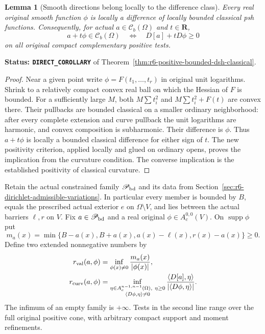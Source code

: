 \documentclass[11pt,a4paper]{article}
\numberwithin{equation}{section}
\newtheorem{lemma}[theorem]{Lemma}
\theoremstyle{definition}
\theoremstyle{remark}
\begin{document}
\begin{lemma}[Smooth directions belong locally to the difference class]
\label{lem:r6-smooth-direction-dsh}
Every real original smooth function $\phi$ is locally a difference
of locally bounded classical psh functions. Consequently, for actual
$a\in\mathcal C_b(\Omega)$ and $t\in\mathbf R$,
\[
 a+t\phi\in\mathcal C_b(\Omega)
       \quad\Longleftrightarrow\quad D[a]+tD\phi\ge0
\]
on all original compact complementary positive tests.
\end{lemma}

\noindent\textbf{Status: \texttt{DIRECT\_COROLLARY}} of
Theorem~\ref{thm:r6-positive-bounded-dsh-classical}.

\begin{proof}
Near a given point write $\phi=F(t_1,\ldots,t_r)$ in original
unit logarithms. Shrink to a relatively compact convex real ball
on which the Hessian of $F$ is bounded. For a sufficiently large
$M$, both $M\sum t_i^2$ and $M\sum t_i^2+F(t)$ are convex
there. Their pullbacks are bounded classical on a smaller ordinary
neighborhood: after every complete extension and curve pullback the
unit logarithms are harmonic, and convex composition is subharmonic.
Their difference is $\phi$. Thus $a+t\phi$ is locally a bounded
classical difference for either sign of $t$. The new positivity
criterion, applied locally and glued on ordinary opens, proves the
implication from the curvature condition. The converse
implication is the established positivity of classical curvature.
\end{proof}

Retain the actual constrained family $\mathscr P_{\rm bd}$ and its
data from Section~\ref{sec:r6-dirichlet-admissible-variations}.
In particular every member is bounded by $B$, equals the prescribed
actual exterior $e$ on $\Omega\setminus V$, and lies between
the actual barriers $\ell,r$ on $V$. Fix
$a\in\mathscr P_{\rm bd}$ and a real original
$\phi\in A_c^{0,0}(V)$. On $\operatorname{supp}\phi$ put
\[
 m_a(x)=\min\{B-a(x),B+a(x),a(x)-\ell(x),r(x)-a(x)\}\ge0.
\]
Define two extended nonnegative numbers by
\begin{align}
 r_{\rm val}(a,\phi)
   &=\inf_{\phi(x)\ne0}\frac{m_a(x)}{|\phi(x)|},\\
 r_{\rm curv}(a,\phi)
   &=\inf_{\substack{\eta\in A_c^{n-1,n-1}(\Omega),\ \eta\ge0\\
                     \langle D\phi,\eta\rangle\ne0}}
       \frac{\langle D[a],\eta\rangle}
            {|\langle D\phi,\eta\rangle|}.
       \label{eq:r6-original-curvature-radius}
\end{align}
The infimum of an empty family is $+\infty$. Tests in the second
line range over the full original positive cone, with arbitrary
compact support and moment refinements.
\end{document}
